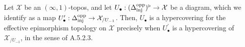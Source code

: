 \documentclass[10pt]{article}
\newcommand{\cX}{\mathcal{X}}
\theoremstyle{witharg}
\theoremstyle{witharg}
\theoremstyle{witharg2}
\begin{document}
\begin{example}{}\label{Comparison of Hypercoverings to SAG}

    Let $\cX$ be an $(\infty,1)$-topos, and let $U_\bullet:(\Delta^{\textnormal{opp}}_{\textnormal{inj}})^\triangleright\rightarrow \cX$ be a diagram, which we identify as a map $U^\prime_\bullet:\Delta^{\textnormal{opp}}_{\textnormal{inj}}\rightarrow \cX_{/U_{-1}}$. Then, $U_\bullet$ is a hypercovering for the effective epimorphism topology on $\cX$ precisely when $U^\prime_\bullet$ is a hypercovering of $\cX_{/U_{-1}}$, in the sense of  A.5.2.3. 


    
\end{example}
\end{document}
